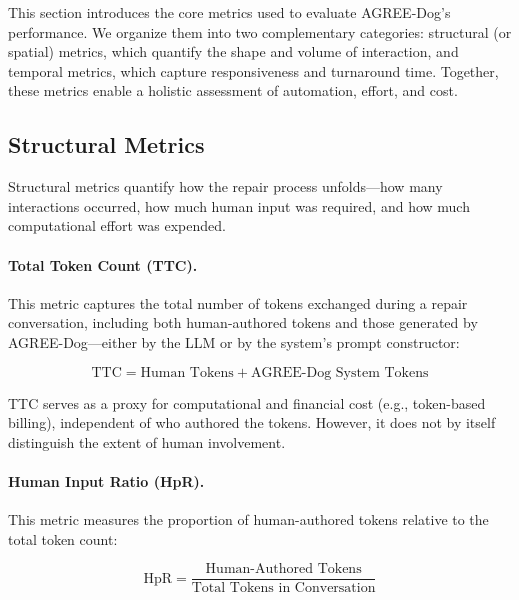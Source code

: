 \label{sec:metrics}

This section introduces the core metrics used to evaluate AGREE-Dog’s performance. We organize them into two complementary categories: structural (or spatial) metrics, which quantify the shape and volume of interaction, and temporal metrics, which capture responsiveness and turnaround time. Together, these metrics enable a holistic assessment of automation, effort, and cost.

\subsection{Structural Metrics}

Structural metrics quantify how the repair process unfolds—how many interactions occurred, how much human input was required, and how much computational effort was expended.

\paragraph{\textbf{Total Token Count (TTC)}.}
This metric captures the total number of tokens exchanged during a repair conversation, including both human-authored tokens and those generated by AGREE-Dog—either by the LLM or by the system’s prompt constructor:

\begin{equation}
\text{TTC} = \text{Human Tokens} + \text{AGREE-Dog System Tokens}
\label{eq:ttc}
\end{equation}

TTC serves as a proxy for computational and financial cost (e.g., token-based billing), independent of who authored the tokens. However, it does not by itself distinguish the extent of human involvement.

\paragraph{\textbf{Human Input Ratio (HpR)}.}
This metric measures the proportion of human-authored tokens relative to the total token count:

\begin{equation}
\text{HpR} = \frac{\text{Human-Authored Tokens}}{\text{Total Tokens in Conversation}}
\label{eq:hpr}
\end{equation}

